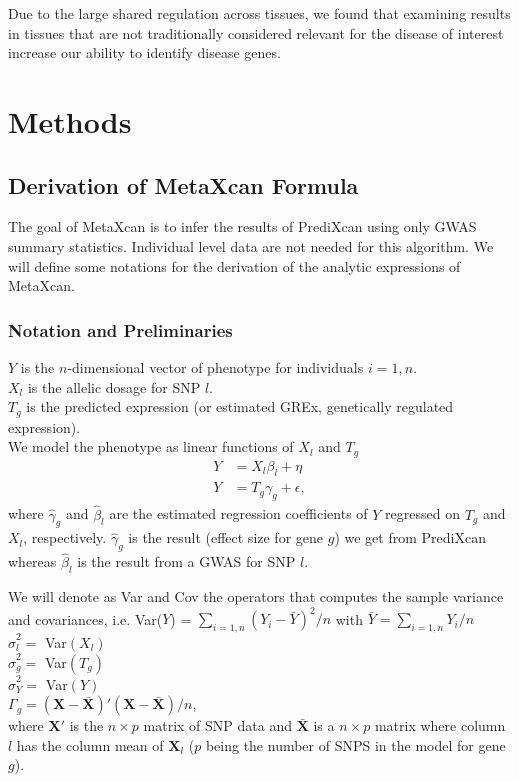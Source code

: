 \documentclass[10pt]{article}
\begin{document}
Due to the large shared regulation across tissues, we found that examining results in tissues that are not traditionally considered relevant for the disease of interest increase our ability to identify disease genes.


\section*{Methods}

\subsection*{Derivation of MetaXcan Formula}

The goal of MetaXcan is to infer the results of PrediXcan using only GWAS summary statistics. Individual level data are not needed for this algorithm. We will define some notations for the derivation of the analytic expressions of MetaXcan.

\subsubsection*{Notation and Preliminaries}

$Y$ is the $n$-dimensional vector of phenotype for individuals $i=1,n$.\\
$X_l$ is the allelic dosage for SNP $l$.\\
$T_g$ is the predicted expression (or estimated GREx, genetically regulated expression).\\
We model the phenotype as linear functions of $X_l$ and $T_g$
\begin{align*}
Y &= X_l \beta_l + \eta\\
Y &= T_g \gamma_g + \epsilon,
\end{align*}
where $\hat\gamma_g$ and $\hat\beta_l$ are the estimated regression coefficients of $Y$ regressed on $T_g$ and $X_l$, respectively. $\hat\gamma_g$ is the result (effect size for gene $g$) we get from PrediXcan whereas $\hat\beta_l$ is the result from a GWAS for SNP $l$.

We will denote as Var and Cov the operators that computes the sample variance and covariances, i.e. Var($Y$) = $\sum_{i=1,n} (Y_i - \bar{Y})^2/n$ with $\bar{Y} = \sum_{i=1,n} Y_i / n$\\
$\hat\sigma^2_l = $  Var$(X_l)$\\
$\hat\sigma^2_g = $  Var$(T_g)$\\
$\hat\sigma^2_Y = $  Var$(Y)$\\
$\Gamma_g = \mathbf{(X-\bar{X})'(X-\bar{X})}/n$,\\ 
 where  $\mathbf{X'}$ is the $n \times p$ matrix of SNP data and $\mathbf{\bar{X}}$ is a $n \times p$ matrix where column $l$ has the column mean of $\mathbf{X}_l$ ($p$ being the number of SNPS in the  model for gene $g$).\\
%
%
\end{document}
